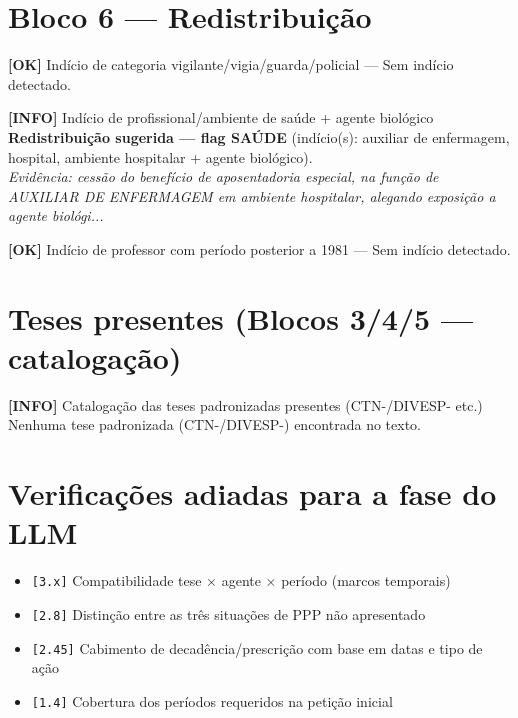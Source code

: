\documentclass[12pt,a4paper]{article}
\newcommand{\statusOK}[1]{\textcolor{corOK}{\textbf{[OK]}} #1}
\newcommand{\statusINFO}[1]{\textcolor{corINFO}{\textbf{[INFO]}} #1}
\begin{document}
\section{Bloco 6 --- Redistribuição}

\statusOK{Indício de categoria vigilante/vigia/guarda/policial} --- Sem indício detectado.

\medskip
\statusINFO{Indício de profissional/ambiente de saúde + agente biológico}\\
\textcolor{corVERIFICAR}{\textbf{Redistribuição sugerida --- flag SAÚDE}} (indício(s): auxiliar de enfermagem, hospital, ambiente hospitalar + agente biológico).
\\
\textit{Evidência: cessão do benefício de aposentadoria especial, na função de AUXILIAR DE ENFERMAGEM em ambiente hospitalar, alegando exposição a agente biológi...}

\medskip
\statusOK{Indício de professor com período posterior a 1981} --- Sem indício detectado.

\section{Teses presentes (Blocos 3/4/5 --- catalogação)}

\statusINFO{Catalogação das teses padronizadas presentes (CTN-/DIVESP- etc.)}\\
Nenhuma tese padronizada (CTN-/DIVESP-) encontrada no texto.

\section{Verificações adiadas para a fase do LLM}

\begin{itemize}
  \item \texttt{[3.x]} Compatibilidade tese × agente × período (marcos temporais)
  \item \texttt{[2.8]} Distinção entre as três situações de PPP não apresentado
  \item \texttt{[2.45]} Cabimento de decadência/prescrição com base em datas e tipo de ação
  \item \texttt{[1.4]} Cobertura dos períodos requeridos na petição inicial
\end{itemize}
\end{document}
